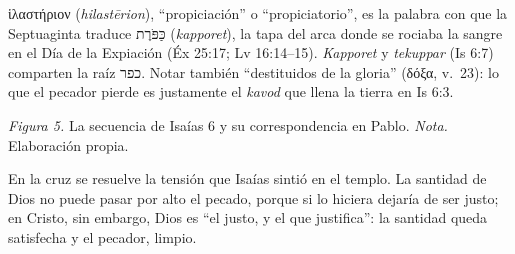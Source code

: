 \documentclass[11pt,letterpaper]{article}
\newcommand{\heb}[1]{\mbox{\foreignlanguage{hebrew}{#1}}}
\newcommand{\grc}[1]{\foreignlanguage{ancientgreek}{#1}}
\begin{document}
\begin{filologia}[Ro 3:25]
\grc{ἱλαστήριον} (\emph{hilastērion}), ``propiciación'' o ``propiciatorio'', es la palabra con que la Septuaginta traduce \heb{כַּפֹּרֶת} (\emph{kapporet}), la tapa del arca donde se rociaba la sangre en el Día de la Expiación (Éx 25:17; Lv 16:14--15). \emph{Kapporet} y \emph{tekuppar} (Is 6:7) comparten la raíz \heb{כפר}. Notar también ``destituidos de la gloria'' (\grc{δόξα}, v.~23): lo que el pecador pierde es justamente el \emph{kavod} que llena la tierra en Is 6:3.
\end{filologia}

\begin{center}
\par
{\footnotesize\color{gris}\textit{Figura 5.} La secuencia de Isaías 6 y su correspondencia en Pablo. \textit{Nota.} Elaboración propia.}
\end{center}

En la cruz se resuelve la tensión que Isaías sintió en el templo. La santidad de Dios no puede pasar por alto el pecado, porque si lo hiciera dejaría de ser justo; en Cristo, sin embargo, Dios es ``el justo, y el que justifica'': la santidad queda satisfecha y el pecador, limpio.
\end{document}
